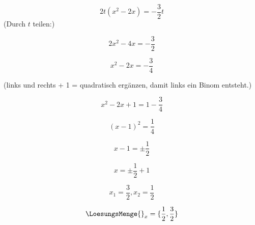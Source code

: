 



\usepackage{cancel}
\renewcommand{\metaHeaderLine}{Musterlösung}
\renewcommand{\arbeitsblattTitel}{Marthaler S. 181 Aufg. 7. e)}

\arbeitsblattHeader{}

$$2t(x^2-2x)=-\frac{3}{2}t$$
(Durch $t$ teilen:)

$$2x^2-4x=-\frac{3}{2}$$

$$x^2-2x=-\frac{3}{4} $$

(links und rechts + 1 = quadratisch ergänzen, damit links ein Binom entsteht.)

$$x^2-2x+1 = 1 -\frac{3}{4}$$

$$(x-1)^2=\frac{1}{4}$$

$$x-1 = \pm \frac{1}{2}$$

$$x=\pm \frac{1}{2}+ 1 $$

$$x_1 = \frac{3}{2}, x_2 = \frac{1}{2}  $$

$$\LoesungsMenge{}_x = \{\frac{1}{2}, \frac{3}{2}\}$$

